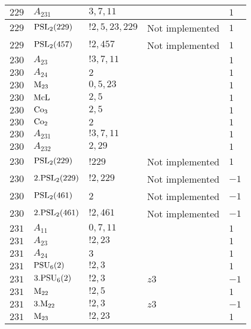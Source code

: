 \documentclass[a4paper, 11pt]{article}
\begin{document}
\begin{longtable}{lllll}
        $ 229 $ & $ A_{231} $ & $ 3, 7, 11 $ & $ ~ $ & $ 1$ \\ \hline
        $ 229 $ & $ {\rm PSL}_{2}(229) $ & $ !2, 5, 23, 229 $ &  Not implemented & $ 1$ \\ \hline
        $ 229 $ & $ {\rm PSL}_{2}(457) $ & $ !2, 457 $ &  Not implemented & $ 1$ \\ \hline
        $ 230 $ & $ A_{23} $ & $ ! 3,7,11 $ & $ ~ $ & $ 1$ \\ \hline
        $ 230 $ & $ A_{24} $ & $ 2 $ & $ ~ $ & $ 1$ \\ \hline
        $ 230 $ & $ {\rm M}_{23} $ & $ 0,5,23 $ & $ ~ $ & $ 1$ \\ \hline
        $ 230 $ & $ {\rm McL} $ & $ 2,5 $ & $ ~ $ & $ 1$ \\ \hline
        $ 230 $ & $ {\rm Co}_{3} $ & $ 2,5 $ & $ ~ $ & $ 1$ \\ \hline
        $ 230 $ & $ {\rm Co}_{2} $ & $ 2 $ & $ ~ $ & $ 1$ \\ \hline
        $ 230 $ & $ A_{231} $ & $ !3, 7, 11 $ & $ ~ $ & $ 1$ \\ \hline
        $ 230 $ & $ A_{232} $ & $ 2, 29 $ & $ ~ $ & $ 1$ \\ \hline
        $ 230 $ & $ {\rm PSL}_{2}(229) $ & $ !229 $ &  Not implemented & $ 1$ \\ \hline
        $ 230 $ & $ 2.{\rm PSL}_{2}(229) $ & $ !2, 229 $ &  Not implemented & $ -1$ \\ \hline
        $ 230 $ & $ {\rm PSL}_{2}(461) $ & $ 2 $ &  Not implemented & $ -1$ \\ \hline
        $ 230 $ & $ 2.{\rm PSL}_{2}(461) $ & $ !2, 461 $ &  Not implemented & $ -1$ \\ \hline
        $ 231 $ & $ A_{11} $ & $ 0,7,11 $ & $ ~ $ & $ 1$ \\ \hline
        $ 231 $ & $ A_{23} $ & $ ! 2,23 $ & $ ~ $ & $ 1$ \\ \hline
        $ 231 $ & $ A_{24} $ & $ 3 $ & $ ~ $ & $ 1$ \\ \hline
        $ 231 $ & $ {\rm PSU}_{6}(2) $ & $ ! 2,3 $ & $ ~ $ & $ 1$ \\ \hline
        $ 231 $ & $ 3.{\rm PSU}_{6}(2) $ & $ ! 2,3 $ & $ z3 $ & $ -1$ \\ \hline
        $ 231 $ & $ {\rm M}_{22} $ & $ ! 2,5 $ & $ ~ $ & $ 1$ \\ \hline
        $ 231 $ & $ 3.{\rm M}_{22} $ & $ ! 2,3 $ & $ z3 $ & $ -1$ \\ \hline
        $ 231 $ & $ {\rm M}_{23} $ & $ ! 2,23 $ & $ ~ $ & $ 1$ \\ \hline

\end{longtable}
\end{document}
